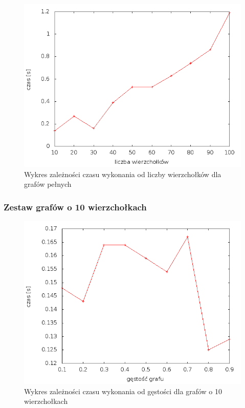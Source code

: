 \documentclass[12pt, a4paper]{article}
\begin{document}
\begin{figure}[h]
    \begin{center}
	\includegraphics[scale=0.5]{results/img/den/den_1.png}
	\caption{Wykres zależności czasu wykonania od liczby wierzchołków dla grafów pełnych}
    \end{center}
\end{figure}
\newpage
\subsubsection*{Zestaw grafów o 10 wierzchołkach}
\begin{figure}[!h]
    \begin{center}
	\includegraphics[scale=0.5]{results/img/dim/dim_10.png}
	\caption{Wykres zależności czasu wykonania od gęstości dla grafów o 10 wierzchołkach}
    \end{center}
\end{figure}
\FloatBarrier
\end{document}
